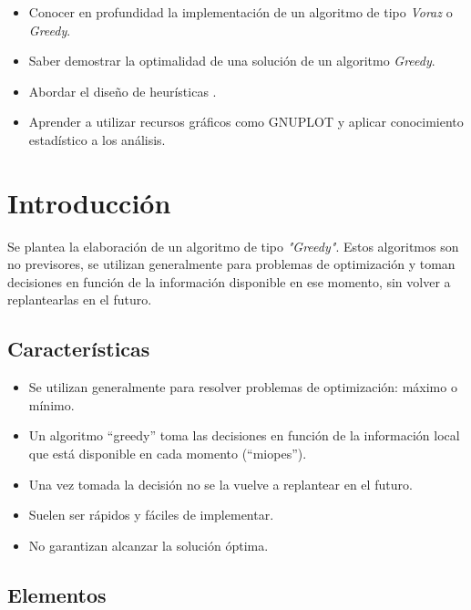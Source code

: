 \documentclass[a4paper,12pt,twoside]{article} %
\begin{document}
	\begin{itemize}
		\item Conocer en profundidad la implementación de un algoritmo de tipo \textit{Voraz} o \textit{Greedy}.
		\item Saber demostrar la optimalidad de una solución de un algoritmo \textit{Greedy}.
		\item Abordar el diseño de heurísticas .
		\item Aprender a utilizar recursos gráficos como GNUPLOT y aplicar conocimiento estadístico a los análisis.
	\end{itemize}
\newpage


\section{Introducción}

Se plantea la elaboración de un algoritmo de tipo \textit{"Greedy"}. Estos algoritmos son no previsores, se utilizan generalmente para problemas de optimización y toman decisiones en función de la información disponible en ese momento, sin volver a replantearlas en el futuro.\\

\subsection{Características}

\begin{itemize}
    \item Se utilizan generalmente para resolver problemas de optimización: máximo o mínimo.
    \item Un algoritmo “greedy” toma las decisiones en función de la información local que está disponible en cada momento (“miopes”).
    \item Una vez tomada la decisión no se la vuelve a replantear en el futuro.
    \item Suelen ser rápidos y fáciles de implementar.
    \item No garantizan alcanzar la solución óptima.
\end{itemize}
\subsection{Elementos}
\end{document}
